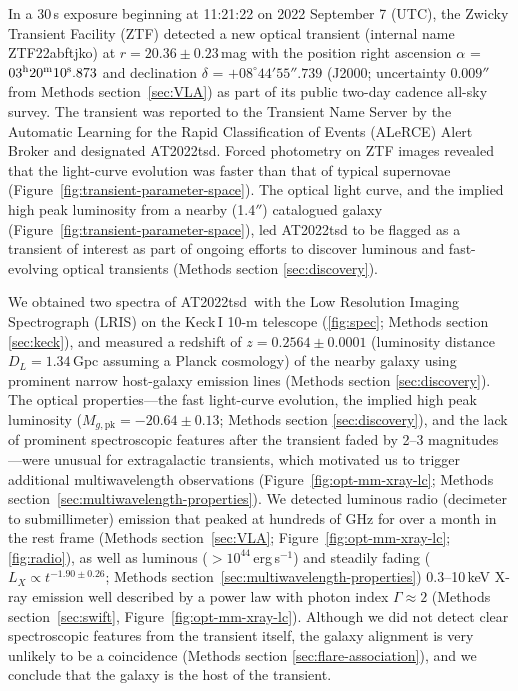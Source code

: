 \documentclass{nature_plusfigure}
\newcommand{\at}{AT2022tsd}
\begin{document}
In a 30\,s exposure beginning at 11:21:22 on 2022 September 7 (UTC), the Zwicky Transient Facility (ZTF\cite{Graham2019,Bellm2019}) detected a new optical transient (internal name ZTF22abftjko) at $r=20.36\pm0.23\,$mag with the position right ascension $\alpha$ = $03^{\rm{h}}20^{\rm{m}}10^{\rm{s}}.873$ and declination $\delta$ = $+08^{\circ} 44' 55''.739$ 
(J2000; uncertainty $0.009''$ from Methods section~\ref{sec:VLA}) as part of its public two-day cadence all-sky survey.
The transient was reported\cite{Munoz-Arancibia2022} to the Transient Name Server by the Automatic Learning for the Rapid Classification of Events (ALeRCE) Alert Broker\cite{Forster2021} and designated AT2022tsd.
Forced photometry on ZTF images\cite{Masci2019} revealed that the light-curve evolution was faster than that of typical supernovae (Figure~\ref{fig:transient-parameter-space}).
The optical light curve, and the implied high peak luminosity from a nearby (1.4$''$) catalogued\cite{Beck2021} galaxy (Figure~\ref{fig:transient-parameter-space}), led AT2022tsd to be flagged as a transient of interest as part of ongoing efforts to discover luminous and fast-evolving optical transients (Methods section \ref{sec:discovery}).

We obtained two spectra of \at\ with the Low Resolution Imaging Spectrograph (LRIS\cite{Oke1995}) on the Keck\,I 10-m telescope (\ref{fig:spec}; Methods section \ref{sec:keck}), and measured\cite{Ho2022_Astronote_Keck} a redshift of $z=0.2564\pm0.0001$ (luminosity distance $D_L=1.34\,$Gpc assuming a Planck cosmology\cite{Planck2020}) of the nearby galaxy using prominent narrow host-galaxy emission lines (Methods section \ref{sec:discovery}). 
The optical properties---the fast light-curve evolution, the implied high peak luminosity ($M_{g,\mathrm{pk}}=-20.64\pm0.13$; Methods section \ref{sec:discovery}), and the lack of prominent spectroscopic features after the transient faded by 2--3 magnitudes---were unusual for extragalactic transients, which motivated us to trigger additional multiwavelength observations (Figure~\ref{fig:opt-mm-xray-lc}; Methods section~\ref{sec:multiwavelength-properties}).
We detected luminous radio (decimeter\cite{Ho2022Astronote_radio} to submillimeter) emission that peaked at hundreds of GHz for over a month in the rest frame (Methods section~\ref{sec:VLA}; Figure~\ref{fig:opt-mm-xray-lc}; \ref{fig:radio}),
as well as luminous ($>10^{44}\,$erg\,s$^{-1}$) and steadily fading ($L_X\propto t^{-1.90\pm0.26}$; Methods section~\ref{sec:multiwavelength-properties}) 0.3--10\,keV X-ray emission\cite{Schulze2022Astronote_xray} well described by a power law with photon index $\Gamma\approx2$ (Methods section~\ref{sec:swift}, Figure~\ref{fig:opt-mm-xray-lc}).
Although we did not detect clear spectroscopic features from the transient itself, the galaxy alignment is very unlikely to be a coincidence (Methods section \ref{sec:flare-association}), and we conclude that the galaxy is the host of the transient.
\end{document}
